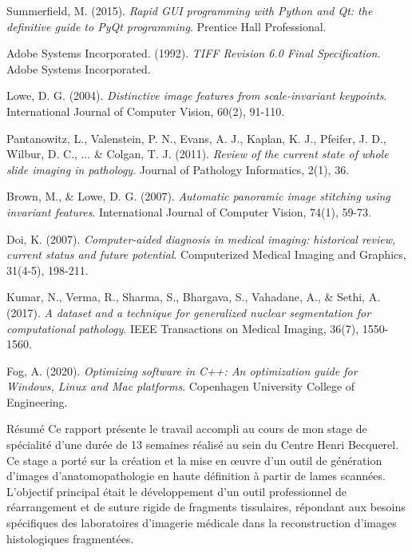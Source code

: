\documentclass[12pt,a4paper]{report}
\begin{document}
\begin{}
\begin{}
\begin{}
\begin{}
\begin{thebibliography}{20}
Summerfield, M. (2015). 
\textit{Rapid GUI programming with Python and Qt: the definitive guide to PyQt programming}. 
Prentice Hall Professional.

Adobe Systems Incorporated. (1992). 
\textit{TIFF Revision 6.0 Final Specification}. 
Adobe Systems Incorporated.

Lowe, D. G. (2004). 
\textit{Distinctive image features from scale-invariant keypoints}. 
International Journal of Computer Vision, 60(2), 91-110.

Pantanowitz, L., Valenstein, P. N., Evans, A. J., Kaplan, K. J., Pfeifer, J. D., Wilbur, D. C., ... \& Colgan, T. J. (2011). 
\textit{Review of the current state of whole slide imaging in pathology}. 
Journal of Pathology Informatics, 2(1), 36.

Brown, M., \& Lowe, D. G. (2007). 
\textit{Automatic panoramic image stitching using invariant features}. 
International Journal of Computer Vision, 74(1), 59-73.

Doi, K. (2007). 
\textit{Computer-aided diagnosis in medical imaging: historical review, current status and future potential}. 
Computerized Medical Imaging and Graphics, 31(4-5), 198-211.

Kumar, N., Verma, R., Sharma, S., Bhargava, S., Vahadane, A., \& Sethi, A. (2017). 
\textit{A dataset and a technique for generalized nuclear segmentation for computational pathology}. 
IEEE Transactions on Medical Imaging, 36(7), 1550-1560.

Fog, A. (2020). 
\textit{Optimizing software in C++: An optimization guide for Windows, Linux and Mac platforms}. 
Copenhagen University College of Engineering.

\end{thebibliography}

\newpage
\thispagestyle{empty}

\begin{resume}{Résumé}
Ce rapport présente le travail accompli au cours de mon stage de spécialité d'une durée de 13 semaines réalisé au sein du Centre Henri Becquerel. Ce stage a porté sur la création et la mise en œuvre d'un outil de génération d'images d'anatomopathologie en haute définition à partir de lames scannées. L'objectif principal était le développement d'un outil professionnel de réarrangement et de suture rigide de fragments tissulaires, répondant aux besoins spécifiques des laboratoires d'imagerie médicale dans la reconstruction d'images histologiques fragmentées.


\end{resume}
\end{}
\end{}
\end{}
\end{}
\end{document}
